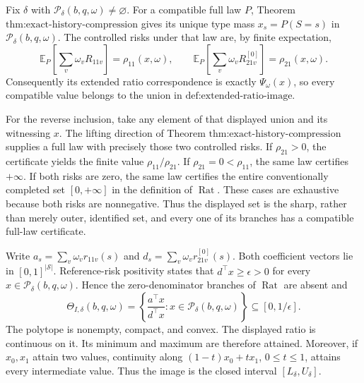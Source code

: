 Fix \(\delta\) with \(\mathcal P_\delta(b,q,\omega)\ne\varnothing\).  For a compatible full law \(P\), Theorem \(\text{thm:exact-history-compression}\) gives its unique type mass \(x_s=P(S=s)\) in \(\mathcal P_\delta(b,q,\omega)\).  The controlled risks under that law are, by finite expectation,
\[
\mathbb E_P\!\left[\sum_v\omega_vR_{11v}\right]=\rho_{11}(x,\omega),
\qquad
\mathbb E_P\!\left[\sum_v\omega_vR^{[0]}_{21v}\right]=\rho_{21}(x,\omega).
\]
Consequently its extended ratio correspondence is exactly \(\Psi_\omega(x)\), so every compatible value belongs to the union in \(\text{def:extended-ratio-image}\).

For the reverse inclusion, take any element of that displayed union and its witnessing \(x\).  The lifting direction of Theorem \(\text{thm:exact-history-compression}\) supplies a full law with precisely those two controlled risks.  If \(\rho_{21}>0\), the certificate yields the finite value \(\rho_{11}/\rho_{21}\).  If \(\rho_{21}=0<\rho_{11}\), the same law certifies \(+\infty\).  If both risks are zero, the same law certifies the entire conventionally completed set \([0,+\infty]\) in the definition of \(\operatorname{Rat}\).  These cases are exhaustive because both risks are nonnegative.  Thus the displayed set is the sharp, rather than merely outer, identified set, and every one of its branches has a compatible full-law certificate.

Write \(a_s=\sum_v\omega_vr_{11v}(s)\) and \(d_s=\sum_v\omega_vr^{[0]}_{21v}(s)\).  Both coefficient vectors lie in \([0,1]^{|\mathcal S|}\).  Reference-risk positivity states that \(d^\top x\geq\epsilon>0\) for every \(x\in\mathcal P_\delta(b,q,\omega)\).  Hence the zero-denominator branches of \(\operatorname{Rat}\) are absent and
\[
\Theta_{I,\delta}(b,q,\omega)
=\left\{\frac{a^\top x}{d^\top x}:x\in\mathcal P_\delta(b,q,\omega)\right\}
\subseteq[0,1/\epsilon].
\]
The polytope is nonempty, compact, and convex.  The displayed ratio is continuous on it.  Its minimum and maximum are therefore attained.  Moreover, if \(x_0,x_1\) attain two values, continuity along \((1-t)x_0+tx_1\), \(0\leq t\leq1\), attains every intermediate value.  Thus the image is the closed interval \([L_\delta,U_\delta]\).

